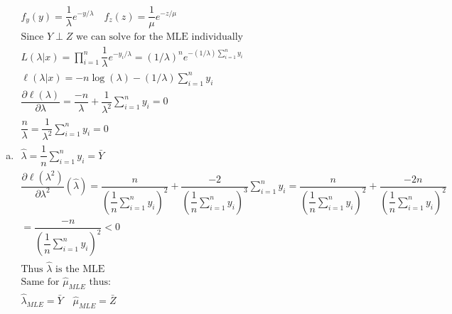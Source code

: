 \documentclass{article}
\newcommand{\lm}{\lambda}
\newcommand{\sumn}{\sum_{i=1}^{n}}
\newcommand{\dll}[1]{\dfrac{\partial\ell({#1})}{\partial{#1}}}
\newcommand{\prodn}{\prod_{i=1}^{n}}
\begin{document}
\begin{flushleft}
\begin{enumerate}[(a)]
	\item 	
\begin{multline*}\\
f_y(y)=\dfrac{1}{\lm}e^{-y/\lm} \quad f_z(z)=\dfrac{1}{\mu}e^{-z/\mu}\\
\text{Since } Y\perp Z \text{ we can solve for the MLE individually}\\
L(\lambda|x)=\prodn \dfrac{1}{\lambda}e^{-y_i/\lm}=(1/\lambda)^n e^{-(1/\lm)\sumn y_i}\\
\ell(\lm|x)=-n\log(\lm)-(1/\lm)\sumn y_i\\
\dll{\lm}=\dfrac{-n}{\lm}+\dfrac{1}{\lm^2}\sumn y_i=0\\
\dfrac{n}{\lm}=\dfrac{1}{\lm^2}\sumn y_i=0\\
\hat{\lm}=\dfrac{1}{n}\sumn y_i=\bar{Y}\\
\dll{\lm^2}(\hat{\lm})=\dfrac{n}{(\dfrac{1}{n}\sumn y_i)^2}+\dfrac{-2}{(\dfrac{1}{n}\sumn y_i)^3}\sumn y_i=\dfrac{n}{(\dfrac{1}{n}\sumn y_i)^2}+\dfrac{-2n}{(\dfrac{1}{n}\sumn y_i)^2}\\
=\dfrac{-n}{(\dfrac{1}{n}\sumn y_i)^2}<0\\
\text{Thus } \hat{\lm} \text{ is the MLE}\\
\text{Same for } \hat{\mu}_{MLE} \text{ thus:}\\
\hat{\lm}_{MLE}=\bar{Y}\quad \hat{\mu}_{MLE}=\bar{Z}\\
\end{multline*}


\end{enumerate}
\end{flushleft}
\end{document}

